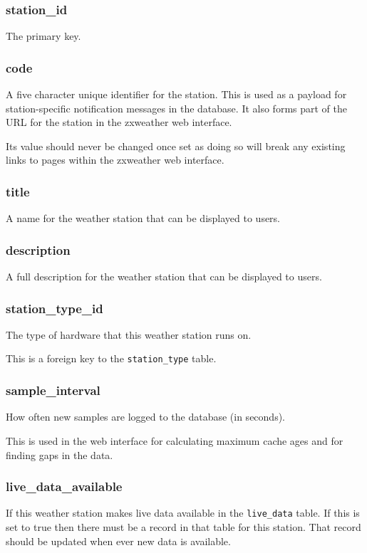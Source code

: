 \documentclass[a4paper,10pt]{book}
\begin{document}
\subsubsection{station\_id}
The primary key.

\subsubsection{code}
A five character unique identifier for the station. This is used as a payload for station-specific notification messages in the database. It also forms part of the URL for the station in the zxweather web interface.

Its value should never be changed once set as doing so will break any existing links to pages within the zxweather web interface.

\subsubsection{title}
A name for the weather station that can be displayed to users.

\subsubsection{description}
A full description for the weather station that can be displayed to users.

\subsubsection{station\_type\_id}
The type of hardware that this weather station runs on.

This is a foreign key to the \verb|station_type| table.

\subsubsection{sample\_interval}
How often new samples are logged to the database (in seconds).

This is used in the web interface for calculating maximum cache ages and for finding gaps in the data.

\subsubsection{live\_data\_available}
If this weather station makes live data available in the \verb|live_data| table. If this is set to true then there must be a record in that table for this station. That record should be updated when ever new data is available.
\end{document}
